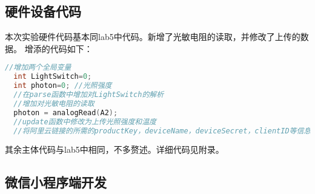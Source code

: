 \documentclass[12pt,hyperref,a4paper,UTF8]{ctexart}
\begin{document}
\subsection{硬件设备代码}
本次实验硬件代码基本同lab5中代码。新增了光敏电阻的读取，并修改了上传的数据。
增添的代码如下：
\begin{lstlisting}[language=C]
  //增加两个全局变量
  int LightSwitch=0;
  int photon=0; //光照强度
  //在parse函数中增加对LightSwitch的解析
  //增加对光敏电阻的读取
  photon = analogRead(A2);
  //update函数中修改为上传光照强度和温度
  //将阿里云链接的所需的productKey，deviceName，deviceSecret，clientID等信息改为ArduinoDev设备的信息
\end{lstlisting}
其余主体代码与lab5中相同，不多赘述。详细代码见附录。

\subsection{微信小程序端开发}
\end{document}
